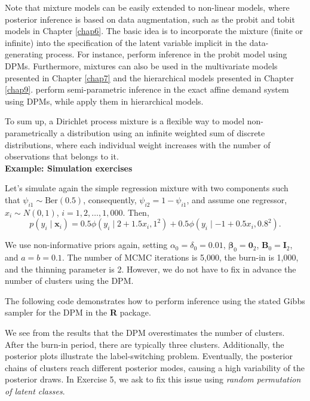 Note that mixture models can be easily extended to non-linear models, where posterior inference is based on data augmentation, such as the probit and tobit models in Chapter \ref{chap6}. The basic idea is to incorporate the mixture (finite or infinite) into the specification of the latent variable implicit in the data-generating process. For instance, \cite{basu2003marginal} perform inference in the probit model using DPMs. Furthermore, mixtures can also be used in the multivariate models presented in Chapter \ref{chap7} and the hierarchical models presented in Chapter \ref{chap9}. \cite{ramirez2024welfare} perform semi-parametric inference in the exact affine demand system \cite{lewbel2009tricks} using DPMs, while \cite{basu2003marginal} apply them in hierarchical models.

To sum up, a Dirichlet process mixture is a flexible way to model non-parametrically a distribution using an infinite weighted sum of discrete distributions, where each individual weight increases with the number of observations that belongs to it.\\

\textbf{Example: Simulation exercises}

Let's simulate again the simple regression mixture with two components such that $\psi_{i1}\sim \text{Ber}(0.5)$, consequently, $\psi_{i2}=1-\psi_{i1}$, and assume one regressor, $x_i\sim N(0,1)$, $i=1,2,\dots,1,000$. Then, 
$$p(y_i \mid \boldsymbol{x}_i) = 
0.5 \phi(y_i \mid 2+1.5x_i,1^2)+0.5 \phi(y_i \mid -1+0.5x_i,0.8^2).$$

We use non-informative priors again, setting $\alpha_{0}=\delta_{0}=0.01$, $\boldsymbol{\beta}_{0}=\boldsymbol{0}_2$, $\boldsymbol{B}_{0}=\boldsymbol{I}_2$, and $a=b=0.1$. The number of MCMC iterations is 5,000, the burn-in is 1,000, and the thinning parameter is 2. However, we do not have to fix in advance the number of clusters using the DPM.

The following code demonstrates how to perform inference using the stated Gibbs sampler for the DPM in the \textbf{R} package.

We see from the results that the DPM overestimates the number of clusters. After the burn-in period, there are typically three clusters. Additionally, the posterior plots illustrate the label-switching problem. Eventually, the posterior chains of clusters reach different posterior modes, causing a high variability of the posterior draws. In Exercise 5, we ask to fix this issue using \textit{random permutation of latent classes}.

